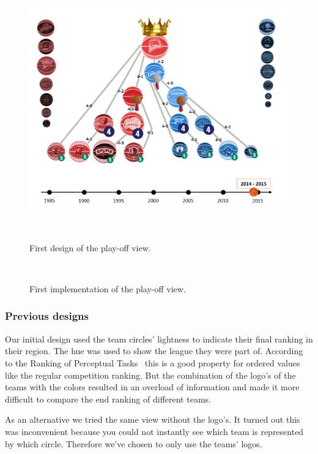 \documentclass[chi_draft]{sigchi}
\begin{document}
\begin{figure}
\centering
  \includegraphics[width=1.0\columnwidth]{figures/playoffviewfirstdesign}
  \caption{First design of the play-off view.}~\label{fig:firstdesignplayoffview}
\end{figure}

\begin{figure}
\centering
  \missingfigure{}
  \caption{First implementation of the play-off view.}~\label{fig:firstimplementationplayoffview}
\end{figure}


\subsubsection{Previous designs}
Our initial design used the team circles' lightness to indicate their final
ranking in their region. The hue was used to show the league they were part of.
According to the Ranking of Perceptual Tasks~\cite{perceptualranking} this is a
good property for ordered values like the regular competition ranking. But the
combination of the logo's of the teams with the colors resulted in an overload
of information and made it more difficult to compare the end ranking of
different teams. 

As an alternative we tried the same view without the logo's. It turned out this 
was inconvenient because you could not instantly see which team is represented 
by which circle. Therefore we've chosen to only use the teams' logos.
\end{document}
